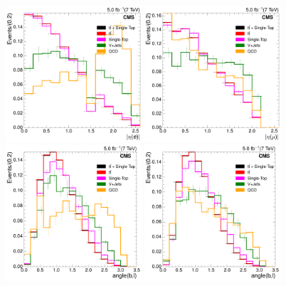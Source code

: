 \begin{figure}[hbtp]
    \centering
     \includegraphics[width=0.45\textwidth]{Chapters/04_Analysis/04b_XSections/images/7TeV/fit_variables/electron/MET/electron_absolute_eta/MET_inclusive_electron_absolute_eta_2orMoreBtags_templates.pdf}\hfill
     \includegraphics[width=0.45\textwidth]{Chapters/04_Analysis/04b_XSections/images/7TeV/fit_variables/muon/MET/muon_absolute_eta/MET_inclusive_muon_absolute_eta_2orMoreBtags_templates.pdf}\\
     \includegraphics[width=0.45\textwidth]{Chapters/04_Analysis/04b_XSections/images/7TeV/fit_variables/electron/MET/angle_bl/MET_inclusive_angle_bl_2orMoreBtags_templates.pdf}\hfill
     \includegraphics[width=0.45\textwidth]{Chapters/04_Analysis/04b_XSections/images/7TeV/fit_variables/muon/MET/angle_bl/MET_inclusive_angle_bl_2orMoreBtags_templates.pdf}\\

\end{figure}
